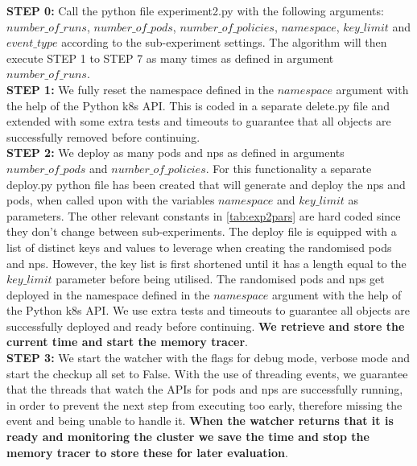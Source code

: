 \textbf{STEP 0:} Call the python file experiment2.py with the following arguments: $number\_of\_runs$, $number\_of\_pods$, $number\_of\_policies$, $namespace$, $key\_limit$ and $event\_type$ according to the sub-experiment settings. The algorithm will then execute STEP 1 to STEP 7 as many times as defined in argument $number\_of\_runs$.
\\[10pt]

\textbf{STEP 1:} We fully reset the namespace defined in the $namespace$ argument with the help of the Python \acrshort{k8s} API. This is coded in a separate delete.py file and extended with some extra tests and timeouts to guarantee that all objects are successfully removed before continuing.
\\[10pt]

\textbf{STEP 2:} We deploy as many pods and \acrshort{np}s as defined in arguments \newline $number\_of\_pods$ and $number\_of\_policies$. For this functionality a separate deploy.py python file has been created that will generate and deploy the \acrshort{np}s and pods, when called upon with the variables $namespace$ and $key\_limit$ as parameters. The other relevant constants in \autoref{tab:exp2pars} are hard coded since they don't change between sub-experiments. The deploy file is equipped with a list of distinct keys and values to leverage when creating the randomised pods and \acrshort{np}s. However, the key list is first shortened until it has a length equal to the $key\_limit$ parameter before being utilised. The randomised pods and \acrshort{np}s get deployed in the namespace defined in the $namespace$ argument with the help of the Python \acrshort{k8s} API. We use extra tests and timeouts to guarantee all objects are successfully deployed and ready before continuing. 
\textbf{We retrieve and store the current time and start the memory tracer}.
\\[10pt]

\textbf{STEP 3:} We start the watcher with the flags for debug mode,  verbose mode and start the checkup all set to False. With the use of threading events, we guarantee that the threads that watch the APIs for pods and \acrshort{np}s are successfully running, in order to prevent the next step from executing too early, therefore missing the event and being unable to handle it. \textbf{When the watcher returns that it is ready and monitoring the cluster we save the time and stop the memory tracer to store these for later evaluation}.
\\[10pt]

